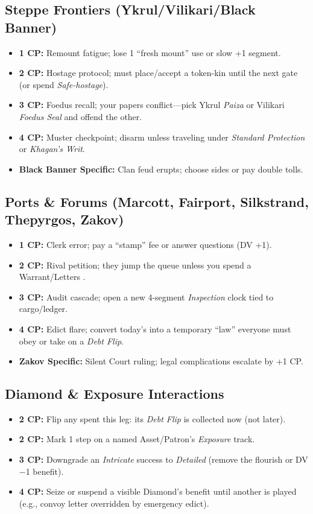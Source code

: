 \subsection{Steppe Frontiers (Ykrul/Vilikari/Black Banner)}
\begin{itemize}
  \item \textbf{1 CP:} Remount fatigue; lose 1 ``fresh mount'' use or slow +1 segment.
  \item \textbf{2 CP:} Hostage protocol; must place/accept a token-kin until the next gate (or spend \emph{Safe-hostage}).
  \item \textbf{3 CP:} Foedus recall; your papers conflict---pick Ykrul \emph{Paiza} or Vilikari \emph{Foedus Seal} and offend the other.
  \item \textbf{4 CP:} Muster checkpoint; disarm unless traveling under \emph{Standard Protection} or \emph{Khagan's Writ}.
  \item \textbf{Black Banner Specific:} Clan feud erupts; choose sides or pay double tolls.
\end{itemize}

\subsection{Ports \& Forums (Marcott, Fairport, Silkstrand, Thepyrgos, Zakov)}
\begin{itemize}
  \item \textbf{1 CP:} Clerk error; pay a ``stamp'' fee or answer questions (DV +1).
  \item \textbf{2 CP:} Rival petition; they jump the queue unless you spend a Warrant/Letters \SuitDiamond{}.
  \item \textbf{3 CP:} Audit cascade; open a new 4-segment \emph{Inspection} clock tied to cargo/ledger.
  \item \textbf{4 CP:} Edict flare; convert today's \SuitClub{} into a temporary ``law'' everyone must obey or take on a \emph{Debt Flip}.
  \item \textbf{Zakov Specific:} Silent Court ruling; legal complications escalate by +1 CP.
\end{itemize}

\subsection{Diamond \& Exposure Interactions}
\begin{itemize}
  \item \textbf{2 CP:} Flip any \SuitDiamond{} spent this leg: its \emph{Debt Flip} is collected now (not later).
  \item \textbf{2 CP:} Mark 1 step on a named Asset/Patron's \emph{Exposure} track.
  \item \textbf{3 CP:} Downgrade an \emph{Intricate} success to \emph{Detailed} (remove the flourish or DV −1 benefit).
  \item \textbf{4 CP:} Seize or suspend a visible Diamond's benefit until another is played (e.g., convoy letter overridden by emergency edict).
\end{itemize}

